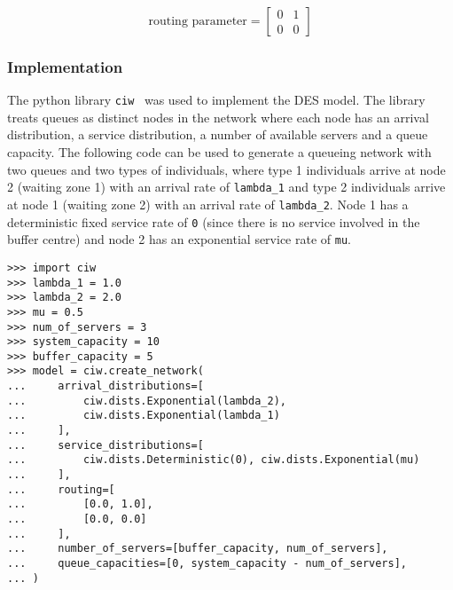 \begin{equation}
    \text{routing parameter} = \left[
    \begin{array}{cc}
        0 & 1 \\
        0 & 0
    \end{array}
    \right]
\end{equation}


\subsubsection{Implementation}
The python library \lstinline[style=pystyle]{ciw}~\cite{ciwpython, ciwarticle}
was used to implement the DES model.
The library treats queues as distinct nodes in the network where each node has
an arrival distribution, a service distribution, a number of available servers
and a queue capacity.
The following code can be used to generate a queueing network with two
queues and two types of individuals, where type 1 individuals arrive at node
2 (waiting zone 1) with an arrival rate of \lstinline[style=pystyle]{lambda_1}
and type 2 individuals arrive at node 1 (waiting zone 2) with an arrival rate of
\lstinline[style=pystyle]{lambda_2}.
Node 1 has a deterministic fixed service rate of \lstinline[style=pystyle]{0}
(since there is no service involved in the buffer centre) and node 2 has an
exponential service rate of \lstinline[style=pystyle]{mu}.

\begin{lstlisting}[style=pystyle]
>>> import ciw
>>> lambda_1 = 1.0
>>> lambda_2 = 2.0
>>> mu = 0.5
>>> num_of_servers = 3
>>> system_capacity = 10
>>> buffer_capacity = 5
>>> model = ciw.create_network(
...     arrival_distributions=[
...         ciw.dists.Exponential(lambda_2),
...         ciw.dists.Exponential(lambda_1)
...     ],
...     service_distributions=[
...         ciw.dists.Deterministic(0), ciw.dists.Exponential(mu)
...     ],
...     routing=[
...         [0.0, 1.0],
...         [0.0, 0.0]
...     ],
...     number_of_servers=[buffer_capacity, num_of_servers],
...     queue_capacities=[0, system_capacity - num_of_servers],
... )

\end{lstlisting}

